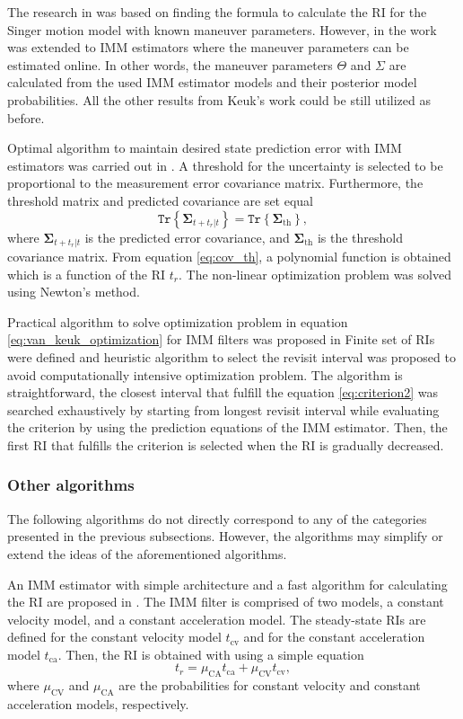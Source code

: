 \documentclass[english, 12pt, a4paper, elec, utf8, a-1b, online]{aaltothesis}
\renewcommand{\vec}[1]{\mathbf{#1}}
\newcommand{\tr}[1]{\texttt{Tr}\left\{ #1 \right\}}
\newcommand{\muca}{\mu_{\text{CA}}}
\newcommand{\mucv}{\mu_{\text{CV}}}
\begin{document}
The research in \cite{Keuk1975, vanKeuk1993} was based on finding the formula to calculate the RI for the Singer motion model with known maneuver parameters.
However, in \cite{Shin1995} the work was extended to IMM estimators where the maneuver parameters can be estimated online.
In other words, the maneuver parameters $\Theta$ and $\Sigma$ are calculated from the used IMM estimator models and their posterior model probabilities.
All the other results from Keuk's work could be still utilized as before.

Optimal algorithm to maintain desired state prediction error with IMM estimators was carried out in \cite{Watson1993}.
A threshold for the uncertainty is selected to be proportional to the measurement error covariance matrix.
Furthermore, the threshold matrix and predicted covariance are set equal
\begin{equation}\label{eq:cov_th}
    \tr{ \vec{\Sigma}_{t+t_r|t} } = \tr{ \vec{\Sigma}_{\text{th}} },
\end{equation}
where $\vec{\Sigma}_{t+t_r|t}$ is the predicted error covariance, and $\vec{\Sigma}_{\text{th}}$ is the threshold covariance matrix.
From equation \eqref{eq:cov_th}, a polynomial function is obtained which is a function of the RI $t_r$.
The non-linear optimization problem was solved using Newton's method.

Practical algorithm to solve optimization problem in equation \ref{eq:van_keuk_optimization} for IMM filters was proposed in \cite{Daeipour1994} Finite set of RIs were defined and heuristic algorithm to select the revisit interval was proposed to avoid computationally intensive optimization problem.
The algorithm is straightforward, the closest interval that fulfill the equation \eqref{eq:criterion2} was searched exhaustively by starting from longest revisit interval while evaluating the criterion by using the prediction equations of the IMM estimator.
Then, the first RI that fulfills the criterion is selected when the RI is gradually decreased.

\subsubsection{Other algorithms}

The following algorithms do not directly correspond to any of the categories presented in the previous subsections.
However, the algorithms may simplify or extend the ideas of the aforementioned algorithms.

 An IMM estimator with simple architecture and a fast algorithm for calculating the RI are proposed in \cite{Benoudnine2006}.
The IMM filter is comprised of two models, a constant velocity model, and a constant acceleration model.
The steady-state RIs are defined for the constant velocity model $t_\text{cv}$ and for the constant acceleration model $t_\text{ca}$.
Then, the RI is obtained with using a simple equation
\begin{equation}\label{eq:fimm}
    t_r = \muca t_\text{ca} + \mucv t_\text{cv},
\end{equation}
where $\mucv$ and $\muca$ are the probabilities for constant velocity and constant acceleration models, respectively.
\end{document}
